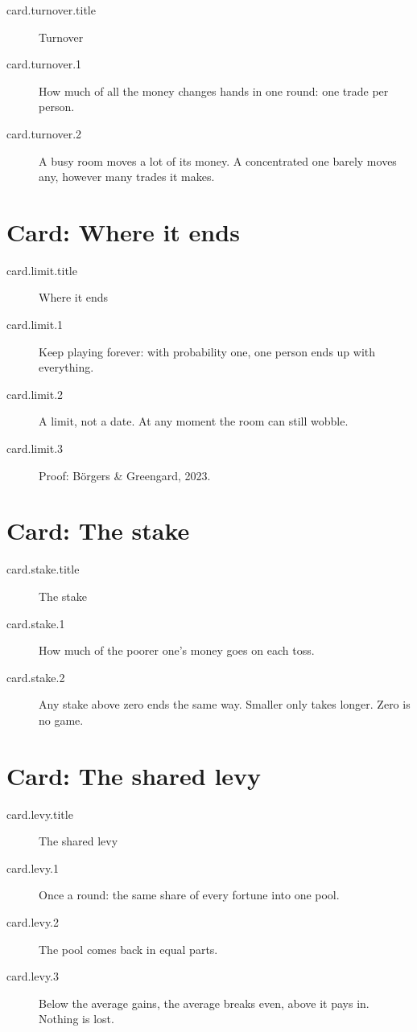 \begin{description}
  \item[card.turnover.title] Turnover
  \item[card.turnover.1] How much of all the money changes hands in one round: one trade per person.
  \item[card.turnover.2] A busy room moves a lot of its money. A concentrated one barely moves any, however many trades it makes.
\end{description}

\section{Card: Where it ends}\label{card:limit}

\begin{description}
  \item[card.limit.title] Where it ends
  \item[card.limit.1] Keep playing forever: with probability one, one person ends up with everything.
  \item[card.limit.2] A limit, not a date. At any moment the room can still wobble.
  \item[card.limit.3] Proof: Börgers \& Greengard, 2023.
\end{description}

\section{Card: The stake}\label{card:stake}

\begin{description}
  \item[card.stake.title] The stake
  \item[card.stake.1] How much of the poorer one's money goes on each toss.
  \item[card.stake.2] Any stake above zero ends the same way. Smaller only takes longer. Zero is no game.
\end{description}

\section{Card: The shared levy}\label{card:levy}

\begin{description}
  \item[card.levy.title] The shared levy
  \item[card.levy.1] Once a round: the same share of every fortune into one pool.
  \item[card.levy.2] The pool comes back in equal parts.
  \item[card.levy.3] Below the average gains, the average breaks even, above it pays in. Nothing is lost.
\end{description}
